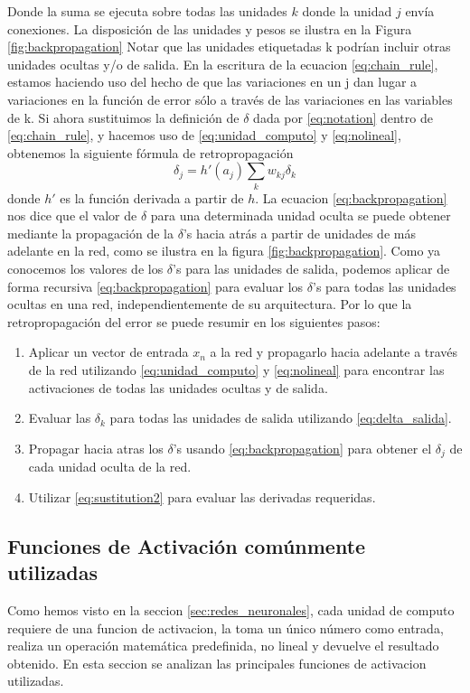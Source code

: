 \documentclass[a4paper,11pt,spanish]{book}
\begin{document}
	Donde la suma se ejecuta sobre todas las unidades $k$ donde la unidad $j$ envía conexiones. La disposición de las unidades y pesos se ilustra en la Figura \ref{fig:backpropagation}
	Notar que las unidades etiquetadas k podrían incluir otras unidades ocultas y/o de salida. En la escritura de la ecuacion \eqref{eq:chain_rule}, estamos haciendo uso del hecho
	de que las variaciones en un j dan lugar a variaciones en la función de error sólo a través de las variaciones en las variables de k. Si ahora sustituimos la definición
	de $\delta$ dada por \eqref{eq:notation} dentro de \eqref{eq:chain_rule}, y hacemos uso de \eqref{eq:unidad_computo} y \eqref{eq:nolineal}, obtenemos la siguiente fórmula de retropropagación
	\begin{equation}\label{eq:backpropagation}
	  \delta_j = h'(a_j) \sum_k w_{kj} \delta_k
	\end{equation}
	donde $h'$ es la función derivada a partir de $h$. La ecuacion \eqref{eq:backpropagation} nos dice que el valor de $\delta$ para una determinada unidad oculta se puede obtener mediante la propagación de la $\delta$'s hacia atrás a partir de unidades
	de más adelante en la red, como se ilustra en la figura \ref{fig:backpropagation}.
	Como ya conocemos los valores de los $\delta$'s para las unidades de salida, podemos aplicar de forma recursiva \eqref{eq:backpropagation} para evaluar los $\delta$'s
	para todas las unidades ocultas en una red, independientemente de su arquitectura.
	Por lo que la retropropagación del error se puede resumir en los siguientes pasos:
	\begin{enumerate}
	  \item Aplicar un vector de entrada $x_n$ a la red y  propagarlo hacia adelante a través de la red utilizando \eqref{eq:unidad_computo} y \eqref{eq:nolineal} para encontrar
	  las activaciones de todas las unidades ocultas y de salida.
	  \item Evaluar las $\delta_k$ para todas las unidades de salida utilizando \eqref{eq:delta_salida}.
	  \item Propagar hacia atras los $\delta$'s usando \eqref{eq:backpropagation} para obtener el $\delta_j$ de cada unidad oculta de la red.
	  \item Utilizar \eqref{eq:sustitution2} para evaluar las derivadas requeridas.
	\end{enumerate}

	\subsection {Funciones de Activación comúnmente utilizadas}
	  Como hemos visto en la seccion \ref{sec:redes_neuronales}, cada unidad de computo requiere de una funcion de activacion, la toma un único número como entrada,
	  realiza un operación matemática predefinida, no lineal y devuelve el resultado obtenido. En esta seccion se analizan las principales funciones de activacion utilizadas.
\end{document}
